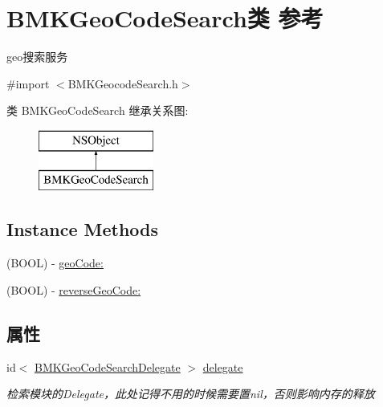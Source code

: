 \hypertarget{interface_b_m_k_geo_code_search}{\section{B\+M\+K\+Geo\+Code\+Search类 参考}
\label{interface_b_m_k_geo_code_search}
}


geo搜索服务  




{\ttfamily \#import $<$B\+M\+K\+Geocode\+Search.\+h$>$}

类 B\+M\+K\+Geo\+Code\+Search 继承关系图\+:\begin{figure}[H]
\begin{center}
\leavevmode
\includegraphics[height=2.000000cm]{interface_b_m_k_geo_code_search}
\end{center}
\end{figure}
\subsection*{Instance Methods}
\begin{DoxyCompactItemize}
\item 
(B\+O\+O\+L) -\/ \hyperlink{interface_b_m_k_geo_code_search_a48248533fdf98ee24679d97716f6d55b}{geo\+Code\+:}
\item 
(B\+O\+O\+L) -\/ \hyperlink{interface_b_m_k_geo_code_search_a3594336ed6a95074f069b4d0ebc75df2}{reverse\+Geo\+Code\+:}
\end{DoxyCompactItemize}
\subsection*{属性}
\begin{DoxyCompactItemize}
\item 
\hypertarget{interface_b_m_k_geo_code_search_a7a816dcf6d4f679ad3287948ad9427d2}{id$<$ \hyperlink{protocol_b_m_k_geo_code_search_delegate-p}{B\+M\+K\+Geo\+Code\+Search\+Delegate} $>$ \hyperlink{interface_b_m_k_geo_code_search_a7a816dcf6d4f679ad3287948ad9427d2}{delegate}}\label{interface_b_m_k_geo_code_search_a7a816dcf6d4f679ad3287948ad9427d2}

\begin{DoxyCompactList}\small\item\em 检索模块的\+Delegate，此处记得不用的时候需要置nil，否则影响内存的释放 \end{DoxyCompactList}\end{DoxyCompactItemize}


